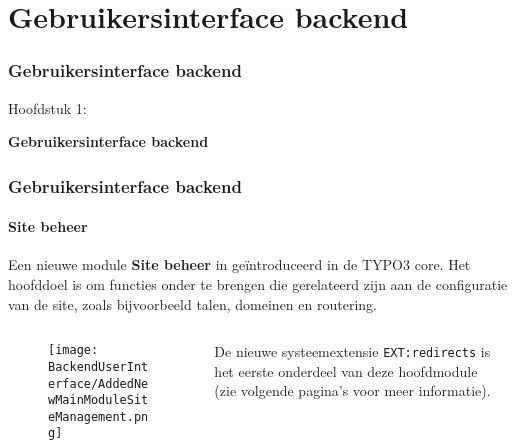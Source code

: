 %

\section{Gebruikersinterface backend}
\begin{frame}[fragile]
	\frametitle{Gebruikersinterface backend}

	\begin{center}\huge{Hoofdstuk 1:}\end{center}
	\begin{center}\huge{\color{typo3darkgrey}\textbf{Gebruikersinterface backend}}\end{center}

\end{frame}


\begin{frame}[fragile]
	\frametitle{Gebruikersinterface backend}
	\framesubtitle{Site beheer}

	Een nieuwe module \textbf{Site beheer} in geïntroduceerd in de TYPO3 core.
	Het hoofddoel is om functies onder te brengen die gerelateerd zijn aan de configuratie van de site,
	zoals bijvoorbeeld talen, domeinen en routering.

	\begin{columns}[T]
		\begin{column}{.4\textwidth}
			\begin{figure}\vspace*{-0.4cm}
				\texttt{[image: BackendUserInterface/AddedNewMainModuleSiteManagement.png]}
			\end{figure}
		\end{column}
		\begin{column}{.5\textwidth}
			De nieuwe systeemextensie \texttt{EXT:redirects} is het eerste onderdeel
			van deze hoofdmodule (zie volgende pagina's voor meer informatie).
		\end{column}
		\begin{column}{.1\textwidth}
		\end{column}
	\end{columns}

\end{frame}

